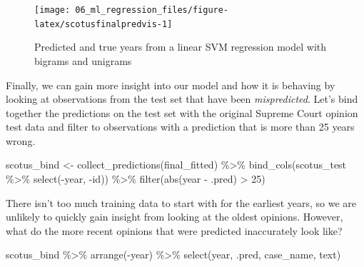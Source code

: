 \documentclass[
]{krantz}
\makeatletter
\newenvironment{Shaded}{\begin{snugshade}}{\end{snugshade}}
\newcommand{\DecValTok}[1]{\textcolor[rgb]{0.00,0.00,0.81}{#1}}
\newcommand{\FunctionTok}[1]{\textcolor[rgb]{0.00,0.00,0.00}{#1}}
\newcommand{\NormalTok}[1]{#1}
\newcommand{\OtherTok}[1]{\textcolor[rgb]{0.56,0.35,0.01}{#1}}
\newcommand{\SpecialCharTok}[1]{\textcolor[rgb]{0.00,0.00,0.00}{#1}}
\newenvironment{kframe}{%
\medskip{}
\setlength{\fboxsep}{.8em}
 \def\at@end@of@kframe{}%
 \ifinner\ifhmode%
  \def\at@end@of@kframe{\end{minipage}}%
  \begin{minipage}{\columnwidth}%
 \fi\fi%
 \def\FrameCommand##1{\hskip\@totalleftmargin \hskip-\fboxsep
 \colorbox{shadecolor}{##1}\hskip-\fboxsep
     \hskip-\linewidth \hskip-\@totalleftmargin \hskip\columnwidth}%
 \MakeFramed {\advance\hsize-\width
   \@totalleftmargin\z@ \linewidth\hsize
   \@setminipage}}%
 {\par\unskip\endMakeFramed%
 \at@end@of@kframe}
\renewenvironment{Shaded}{\begin{kframe}}{\end{kframe}}
\makeatother
\begin{document}
\begin{figure}

{\centering \texttt{[image: 06\_ml\_regression\_files/figure-latex/scotusfinalpredvis-1]} 

}

\caption{Predicted and true years from a linear SVM regression model with bigrams and unigrams}\label{fig:scotusfinalpredvis}
\end{figure}

Finally, we can gain more insight into our model and how it is behaving by looking at observations from the test set that have been \emph{mispredicted}. Let's bind together the predictions on the test set with the original Supreme Court opinion test data and filter to observations with a prediction that is more than 25 years wrong.

\begin{Shaded}
\begin{Highlighting}[]
\NormalTok{scotus\_bind }\OtherTok{\textless{}{-}} \FunctionTok{collect\_predictions}\NormalTok{(final\_fitted) }\SpecialCharTok{\%\textgreater{}\%}
  \FunctionTok{bind\_cols}\NormalTok{(scotus\_test }\SpecialCharTok{\%\textgreater{}\%} \FunctionTok{select}\NormalTok{(}\SpecialCharTok{{-}}\NormalTok{year, }\SpecialCharTok{{-}}\NormalTok{id)) }\SpecialCharTok{\%\textgreater{}\%}
  \FunctionTok{filter}\NormalTok{(}\FunctionTok{abs}\NormalTok{(year }\SpecialCharTok{{-}}\NormalTok{ .pred) }\SpecialCharTok{\textgreater{}} \DecValTok{25}\NormalTok{)}
\end{Highlighting}
\end{Shaded}

There isn't too much training data to start with for the earliest years, so we are unlikely to quickly gain insight from looking at the oldest opinions. However, what do the more recent opinions that were predicted inaccurately look like?

\begin{Shaded}
\begin{Highlighting}[]
\NormalTok{scotus\_bind }\SpecialCharTok{\%\textgreater{}\%}
  \FunctionTok{arrange}\NormalTok{(}\SpecialCharTok{{-}}\NormalTok{year) }\SpecialCharTok{\%\textgreater{}\%}
  \FunctionTok{select}\NormalTok{(year, .pred, case\_name, text)}
\end{Highlighting}
\end{Shaded}
\end{document}
